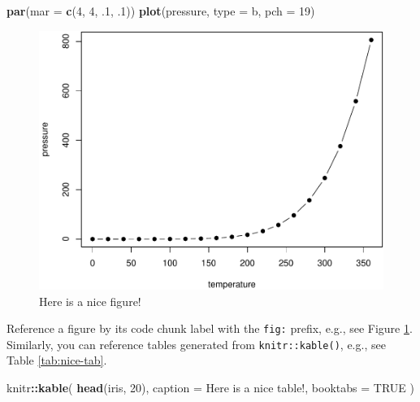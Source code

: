 \documentclass[
]{book}
\newenvironment{Shaded}{\begin{snugshade}}{\end{snugshade}}
\newcommand{\AttributeTok}[1]{\textcolor[rgb]{0.13,0.29,0.53}{#1}}
\newcommand{\ConstantTok}[1]{\textcolor[rgb]{0.56,0.35,0.01}{#1}}
\newcommand{\DecValTok}[1]{\textcolor[rgb]{0.00,0.00,0.81}{#1}}
\newcommand{\FunctionTok}[1]{\textcolor[rgb]{0.13,0.29,0.53}{\textbf{#1}}}
\newcommand{\NormalTok}[1]{#1}
\newcommand{\SpecialCharTok}[1]{\textcolor[rgb]{0.81,0.36,0.00}{\textbf{#1}}}
\newcommand{\StringTok}[1]{\textcolor[rgb]{0.31,0.60,0.02}{#1}}
\begin{document}
\begin{Shaded}
\begin{Highlighting}[]
\FunctionTok{par}\NormalTok{(}\AttributeTok{mar =} \FunctionTok{c}\NormalTok{(}\DecValTok{4}\NormalTok{, }\DecValTok{4}\NormalTok{, .}\DecValTok{1}\NormalTok{, .}\DecValTok{1}\NormalTok{))}
\FunctionTok{plot}\NormalTok{(pressure, }\AttributeTok{type =} \StringTok{\textquotesingle{}b\textquotesingle{}}\NormalTok{, }\AttributeTok{pch =} \DecValTok{19}\NormalTok{)}
\end{Highlighting}
\end{Shaded}

\begin{figure}

{\centering \includegraphics[width=0.8\linewidth]{01-BOLUM_files/figure-latex/nice-fig-1} 

}

\caption{Here is a nice figure!}\label{fig:nice-fig}
\end{figure}

Reference a figure by its code chunk label with the \texttt{fig:} prefix, e.g., see Figure \ref{fig:nice-fig}. Similarly, you can reference tables generated from \texttt{knitr::kable()}, e.g., see Table \ref{tab:nice-tab}.

\begin{Shaded}
\begin{Highlighting}[]
\NormalTok{knitr}\SpecialCharTok{::}\FunctionTok{kable}\NormalTok{(}
  \FunctionTok{head}\NormalTok{(iris, }\DecValTok{20}\NormalTok{), }\AttributeTok{caption =} \StringTok{\textquotesingle{}Here is a nice table!\textquotesingle{}}\NormalTok{,}
  \AttributeTok{booktabs =} \ConstantTok{TRUE}
\NormalTok{)}
\end{Highlighting}
\end{Shaded}
\end{document}
